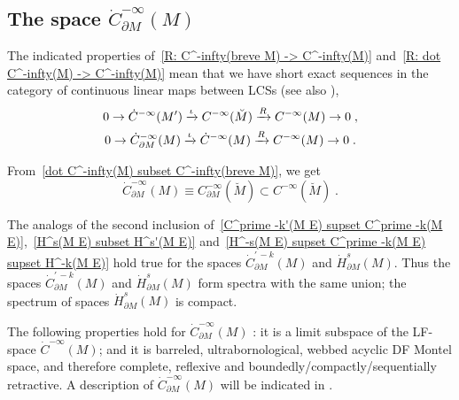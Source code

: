 \documentclass{memo-l}
\theoremstyle{plain}
\theoremstyle{definition}
\theoremstyle{remark}
\numberwithin{section}{chapter}
\numberwithin{equation}{section}%
\begin{document}
\subsection{The space $\dot C^{-\infty}_{\partial M}(M)$}\label{ss: dot C^-infty_partial M(M)} 

The indicated properties of~\eqref{R: C^-infty(breve M) -> C^-infty(M)} and~\eqref{R: dot C^-infty(M) -> C^-infty(M)} mean that we have short exact sequences in the category of continuous linear maps between LCSs (see also \cite[Proposition~3.3.1]{Melrose1996}), 
\begin{gather}
0\to\dot C^{-\infty}(M') \xrightarrow{\iota} C^{-\infty}(\breve M) \xrightarrow{R} C^{-\infty}(M)\to0\;,\notag\\
0\to\dot C^{-\infty}_{\partial M}(M) \xrightarrow{\iota} \dot C^{-\infty}(M) \xrightarrow{R} C^{-\infty}(M)\to0\;.
\label{0 -> dot C^-infty_partial M(M) -> dot C^-infty(M) -> C^-infty(M) -> 0}
\end{gather}

From~\eqref{dot C^-infty(M) subset C^-infty(breve M)}, we get 
\begin{equation}\label{dot C^-infty_partial M(M) equiv C^-infty_partial M(breve M)}
\dot C^{-\infty}_{\partial M}(M)\equiv C^{-\infty}_{\partial M}(\breve M)\subset C^{-\infty}(\breve M)\;.
\end{equation}

The analogs of the second inclusion of~\eqref{C^prime -k'(M E) supset C^prime -k(M E)},~\eqref{H^s(M E) subset H^s'(M E)} and~\eqref{H^-s(M E) supset C^prime -k(M E) supset H^-k(M E)} hold true for the spaces $\dot C^{\prime\,-k}_{\partial M}(M)$ and $\dot H^s_{\partial M}(M)$. Thus the spaces $\dot C^{\prime\,-k}_{\partial M}(M)$  and $\dot H^s_{\partial M}(M)$  form spectra with the same union; the spectrum of spaces $\dot H^s_{\partial M}(M)$ is compact.

The following properties hold for $\dot C^{-\infty}_{\partial M}(M)$ \cite[Corollary~6.4 and~6.5]{AlvKordyLeichtnam-conormal}: it is a limit subspace of the LF-space $\dot C^{-\infty}(M)$; and it is barreled, ultrabornological, webbed acyclic DF Montel space, and therefore complete, reflexive and boundedly/compactly/sequentially retractive. A description of $\dot C^{-\infty}_{\partial M}(M)$ will be indicated in .
\end{document}
